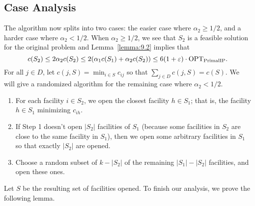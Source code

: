 \subsection{Case Analysis}
The algorithm now splits into two cases: the easier case where 
$\alpha_2 \geq 1/2$, and a harder 
case where $\alpha_2 < 1/2$. When $\alpha_2 \geq 1/2$, 
we see that $S_2$ is a feasible solution for the original problem and 
Lemma~\ref{lemma:9.2} implies that 
\[ c(S_2) \leq 2\alpha_2 c(S_2) \leq 2(\alpha_1 c(S_1) + \alpha_2 c(S_2)) 
\leq 6(1+\varepsilon) \cdot \text{OPT}_{\text{PrimalIP}}. \] 
For all $j \in D$, let $c(j, S) = \min_{i\in S} c_{ij}$ so that $\sum_{j\in D} c(j, S) = c(S)$. 
We will give a randomized algorithm for the remaining case where $\alpha_2 < 1/2$. 
\begin{enumerate}
    \item For each facility $i \in S_2$, we open the closest facility $h \in S_1$; that 
    is, the facility $h \in S_1$ minimizing $c_{ih}$.
    \item If Step 1 doesn't open $|S_2|$ facilities of $S_1$ (because some facilities in $S_2$ are 
    close to the same facility in $S_1$), then we open some arbitrary 
    facilities in $S_1$ so that exactly $|S_2|$ are opened. 
    \item Choose a random subset of $k - |S_2|$ of the remaining $|S_1| - |S_2|$ facilities, 
    and open these ones.
\end{enumerate}
Let $S$ be the resulting set of facilities opened. To finish our 
analysis, we prove the following lemma. 

